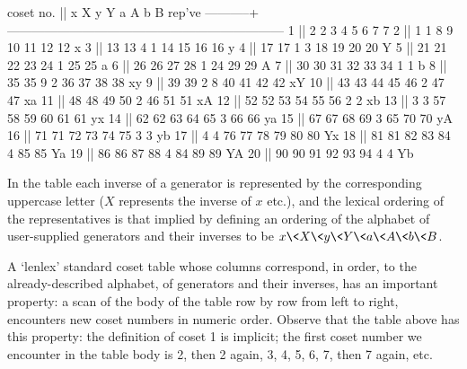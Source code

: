 \begintt
 coset no. ||      x      X      y      Y      a      A      b      B   rep've
-----------+------------------------------------------------------------------
         1 ||      2      2      3      4      5      6      7      7
         2 ||      1      1      8      9     10     11     12     12    x
         3 ||     13     13      4      1     14     15     16     16    y
         4 ||     17     17      1      3     18     19     20     20    Y
         5 ||     21     21     22     23     24      1     25     25    a
         6 ||     26     26     27     28      1     24     29     29    A
         7 ||     30     30     31     32     33     34      1      1    b
         8 ||     35     35      9      2     36     37     38     38    xy
         9 ||     39     39      2      8     40     41     42     42    xY
        10 ||     43     43     44     45     46      2     47     47    xa
        11 ||     48     48     49     50      2     46     51     51    xA
        12 ||     52     52     53     54     55     56      2      2    xb
        13 ||      3      3     57     58     59     60     61     61    yx
        14 ||     62     62     63     64     65      3     66     66    ya
        15 ||     67     67     68     69      3     65     70     70    yA
        16 ||     71     71     72     73     74     75      3      3    yb
        17 ||      4      4     76     77     78     79     80     80    Yx
        18 ||     81     81     82     83     84      4     85     85    Ya
        19 ||     86     86     87     88      4     84     89     89    YA
        20 ||     90     90     91     92     93     94      4      4    Yb
\endtt

In the table each  inverse  of  a  generator  is  represented  by  the
corresponding uppercase letter ($X$  represents  the  inverse  of  $x$
etc.), and the lexical ordering of the representatives is that implied
by defining an ordering of the alphabet  of  user-supplied  generators
and  their  inverses  to  be  $x\<X\<y\<Y\<a\<A\<b\<B$.  

A `lenlex' standard coset table whose columns correspond, in order, to
the already-described alphabet, of generators and their inverses,  has
an important property: a scan of the body of the table row by row from
left to right, encounters new coset numbers in numeric order.  Observe
that the table above has this property: the definition of coset  1  is
implicit; the first coset number we encounter in the table body is  2,
then 2 again, 3, 4, 5, 6, 7, then 7 again, etc.

